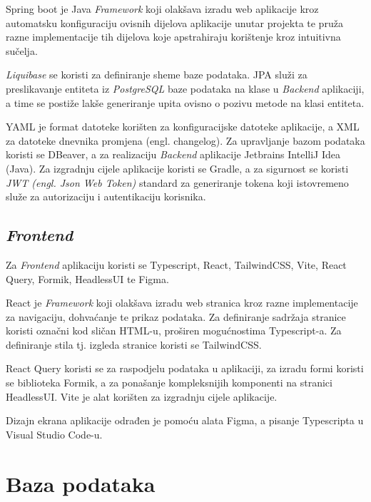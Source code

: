 		Spring boot je Java \textit{Framework} koji olakšava izradu web aplikacije kroz automatsku konfiguraciju ovisnih dijelova aplikacije unutar projekta te pruža razne implementacije tih dijelova koje apstrahiraju korištenje kroz intuitivna sučelja.


		\textit{Liquibase} se koristi za definiranje sheme baze podataka. JPA služi za preslikavanje entiteta iz \textit{PostgreSQL} baze podataka na klase u \textit{Backend} aplikaciji, a time se postiže lakše generiranje upita ovisno o pozivu metode na klasi entiteta.



		YAML je format datoteke korišten za konfiguracijske datoteke aplikacije, a XML za datoteke dnevnika promjena (engl. changelog). Za upravljanje bazom podataka koristi se DBeaver, a za realizaciju \textit{Backend} aplikacije Jetbrains IntelliJ Idea (Java). Za izgradnju cijele aplikacije koristi se Gradle, a za sigurnost se koristi \textit{JWT (engl. Json Web Token)} standard za generiranje tokena koji istovremeno služe za autorizaciju i autentikaciju korisnika.


		\subsection{\textit{Frontend}}
		Za \textit{Frontend} aplikaciju koristi se Typescript, React, TailwindCSS, Vite, React Query, Formik, HeadlessUI te Figma.


		React je \textit{Framework} koji olakšava izradu web stranica kroz razne implementacije za navigaciju, dohvaćanje te prikaz podataka. Za definiranje sadržaja stranice koristi označni kod sličan HTML-u, proširen mogućnostima Typescript-a. Za definiranje stila tj. izgleda stranice koristi se TailwindCSS.


		React Query koristi se za raspodjelu podataka u aplikaciji, za izradu formi koristi se biblioteka Formik, a za ponašanje kompleksnijih komponenti na stranici HeadlessUI. Vite je alat korišten za izgradnju cijele aplikacije.


		Dizajn ekrana aplikacije odrađen je pomoću alata Figma, a pisanje Typescripta u Visual Studio Code-u.







		\eject


		\section{Baza podataka}

